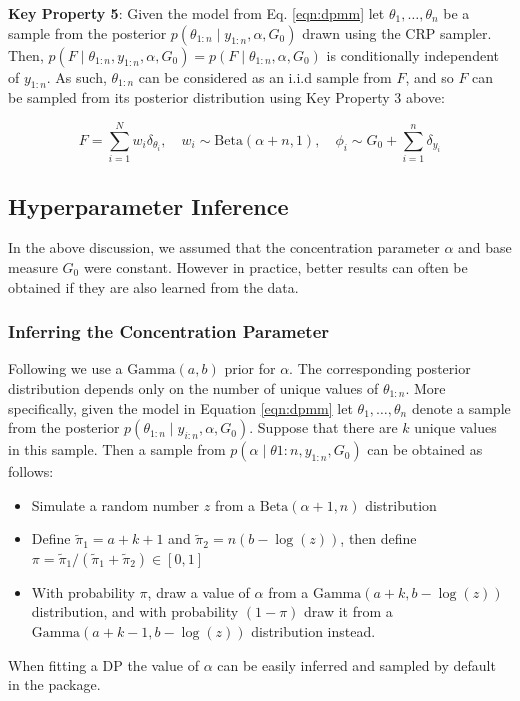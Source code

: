 \documentclass[nojss]{jss}
\begin{document}
\begin{tcolorbox}
\textbf{Key Property 5}: Given the model from Eq. \eqref{eqn:dpmm} let $\theta_1,\ldots,\theta_n$  be a sample from the posterior $p(\theta_{1:n} \mid y_{1:n},\alpha,G_0)$ drawn using the CRP sampler. Then, $p(F \mid \theta_{1:n},y_{1:n},\alpha,G_0) = p(F\mid\theta_{1:n},\alpha,G_0)$ is conditionally independent of $y_{1:n}$. As such, $\theta_{1:n}$ can be considered as an i.i.d sample from $F$, and so $F$ can be sampled from its posterior distribution using Key Property 3 above:

$$F = \sum_{i=1}^N w_i \delta_{\theta_i}, \quad w_i \sim \text{Beta}(\alpha+n,1), \quad \phi_i \sim G_0 + \sum_{i=1}^n \delta_{y_i}$$
\end{tcolorbox}


\subsection{Hyperparameter Inference} \label{subsec:hyperparam}

In the above discussion, we assumed that the concentration parameter $\alpha$ and base measure $G_0$ were constant. However in practice, better results can often be obtained if they are also learned from the data.

\subsubsection{Inferring the Concentration Parameter}\label{subsubsec:concentration}
Following \cite{west_hyperparameter_1992} we use a $\text{Gamma} (a, b)$ prior for $\alpha$. The corresponding posterior distribution depends only on the number of unique values of $\theta_{1:n}$. More specifically, given the model in Equation \eqref{eqn:dpmm} let $\theta_1,\ldots,\theta_n$ denote a sample from the posterior $p(\theta_{1:n} \mid y_{i:n} , \alpha, G_0 )$. Suppose that there are $k$ unique values in this sample. Then a sample from $p(\alpha \mid \theta{1:n}, y_{1:n} , G_0)$ can be obtained as follows:

\begin{itemize}
\item Simulate a random number $z$ from a $\text{Beta}(\alpha + 1, n)$ distribution
\item Define $\tilde{\pi}_1 = a + k + 1$ and $\tilde{\pi}_2 = n (b - \log(z))$, then define $\pi = \tilde{\pi}_1/(\tilde{\pi}_1 + \tilde{\pi}_2) \in [0, 1]$
\item With probability $\pi$, draw a value of $\alpha$ from a $\text{Gamma} (a + k, b - \log(z))$ distribution, and with probability $(1 - \pi)$ draw it from a $\text{Gamma}(a + k - 1, b - \log(z))$ distribution instead.
\end{itemize}
When fitting a DP the value of $\alpha$ can be easily inferred and sampled by default in the  package.
\end{document}

